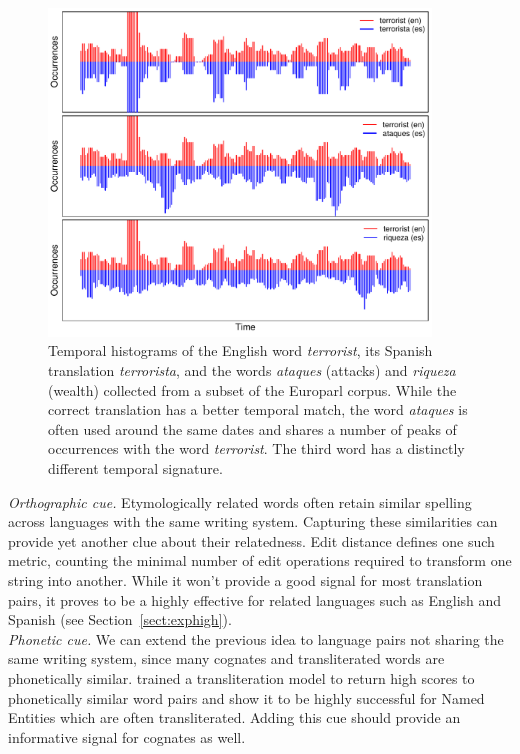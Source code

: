 \documentclass{article}
\newcommand{\secref}[1]{Section~\ref{#1}}
\begin{document}
\begin{figure}[h]
\centerline{\mbox{\includegraphics[width=4in]{figures/temporal/temporal}}}
\caption{Temporal histograms of the English word {\em terrorist}, its Spanish translation {\em terrorista}, and the words {\em ataques}  (attacks) and {\em riqueza} (wealth) collected from a subset of the Europarl corpus. While the correct translation has a better temporal match, the word {\em ataques} is often used around the same dates and shares a number of peaks of occurrences with the word {\em terrorist}.  The third word has a distinctly different temporal signature.}
\label{fig:temporal}
\end{figure}

\noindent\emph{Orthographic cue.} Etymologically related words often retain similar spelling across languages with the same writing system.  Capturing these similarities can provide yet another clue about their relatedness.  Edit distance defines one such metric, counting the minimal number of edit operations required to transform one string into another.  While it won't provide a good signal for most translation pairs, it proves to be a highly effective for related languages such as English and Spanish (see \secref{sect:exphigh}). \\

\noindent\emph{Phonetic cue.}  We can extend the previous idea to language pairs not sharing the same writing system, since many cognates and transliterated words are phonetically similar.  \cite{Klementiev:2006b} trained a transliteration model to return high scores to phonetically similar word pairs and show it to be highly successful for Named Entities which are often transliterated.  Adding this cue should provide an informative signal for cognates as well. \\
\end{document}
